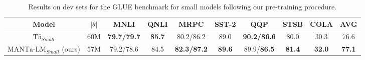 \begin{table}[]
\centering\small
\begin{tabular}{cccccccccc}
\toprule
Model                                   & $|\theta|$ & MNLI      & QNLI & MRPC      & SST-2 & QQP       & STSB & COLA & AVG  \\ \midrule
$\text{T5}_{Small}$                     & 60M       & \textbf{79.7/79.7} & \textbf{85.7} & 80.2/86.2 & 89.0  & \textbf{90.2/86.6} & 80.0 & 30.3 & 76.6 \\[3pt]
$\text{MANTa-LM}_{Small}$ (ours)     & 57M          & 79.2/78.6 & 84.5 & \textbf{82.3/87.2}    & \textbf{89.6}  & 89.9/\textbf{86.5}    & \textbf{81.4} & \textbf{32.0} & \textbf{77.1} \\ \bottomrule
\end{tabular}
\caption{Results on dev sets for the GLUE benchmark for small models following our pre-training procedure.}
\label{tab:glue_small}
\end{table}
